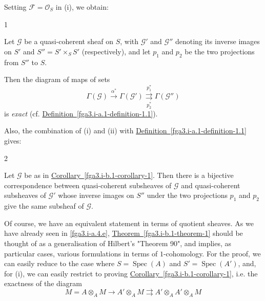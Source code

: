   Setting \(\mathcal {F}=\mathscr {O}_S\) in (i), we obtain:\begin{corollary}{1}\label{fga3.i-b.1-corollary-1}\skipsinglepar\par{}Let \(\mathscr {G}\) be a quasi-coherent sheaf on \(S\), with \(\mathscr {G}'\) and \(\mathscr {G}''\) denoting its inverse images on \(S'\) and \(S''=S'\times _S S'\) (respectively), and let \(p_1\) and \(p_2\) be the two projections from \(S''\) to \(S\).
    
    Then the diagram of maps of sets
    \[       \Gamma (\mathscr {G}) \xrightarrow {\alpha ^*}       \Gamma (\mathscr {G}') \overset {p_1^*}{\underset {p_2^*}{\rightrightarrows }}       \Gamma (\mathscr {G}'')     \]
    is \emph{exact} (cf. \hyperref[fga3.i-a.1-definition-1.1]{Definition~\ref*{fga3.i-a.1-definition-1.1}}).\end{corollary}\par{}Also, the combination of (i) and (ii) with \hyperref[fga3.i-a.1-definition-1.1]{Definition~\ref*{fga3.i-a.1-definition-1.1}} gives:\begin{theorem}{2}\label{fga3.i-b.1-corollary-2}\skipsinglepar\par{}Let \(\mathscr {G}\) be as in \hyperref[fga3.i-b.1-corollary-1]{Corollary~\ref*{fga3.i-b.1-corollary-1}}.
    Then there is a bijective correspondence between quasi-coherent subsheaves of \(\mathscr {G}\) and quasi-coherent subsheaves of \(\mathscr {G}'\) whose inverse images on \(S''\) under the two projections \(p_1\) and \(p_2\) give the same subsheaf of \(\mathscr {G}\).\end{theorem}\par{}Of course, we have an equivalent statement in terms of quotient sheaves.
  As we have already seen in \cref{fga3.i-a.4.e}, \hyperref[fga3.i-b.1-theorem-1]{Theorem~\ref*{fga3.i-b.1-theorem-1}} should be thought of as a generalisation of Hilbert's "Theorem 90", and implies, as particular cases, various formulations in terms of \(1\)-cohomology.
  For the proof, we can easily reduce to the case where \(S=\operatorname {Spec}(A)\) and \(S'=\operatorname {Spec}(A')\), and, for (i), we can easily restrict to proving \hyperref[fga3.i-b.1-corollary-1]{Corollary~\ref*{fga3.i-b.1-corollary-1}}, i.e. the exactness of the diagram
  \[     M = A\otimes _A M \to      A'\otimes _A M \rightrightarrows      A'\otimes _A A'\otimes _A M   \]
